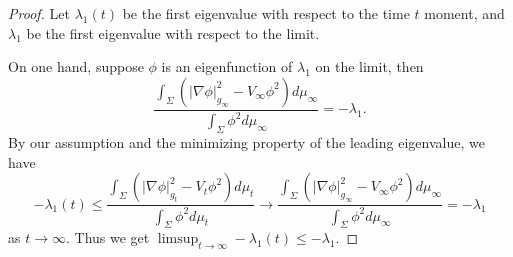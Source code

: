 \documentclass[12pt]{amsart}
\numberwithin{equation}{section}
\numberwithin{equation}{section}
\begin{document}
	\begin{proof}
		Let $\lambda_1(t)$ be the first eigenvalue with respect to the time $t$ moment, and $\lambda_1$ be the first eigenvalue with respect to the limit.
		
		On one hand, suppose $\phi$ is an eigenfunction of $\lambda_1$ on the limit, then
		$$
		\frac{ \int_\Sigma (|\nabla \phi|_{g_\infty}^2-V_\infty \phi^2 )d\mu_\infty }{\int_\Sigma \phi^2 d\mu_\infty}=-\lambda_1.
		$$
		By our assumption and the minimizing property of the leading eigenvalue, we have
		\begin{equation}
			-\lambda_1(t)\leq \frac{\int_\Sigma (|\nabla \phi|_{g_t}^2-V_t\phi^2 )d\mu_t }{\int_\Sigma \phi^2 d\mu_t} 
			\to 
			\frac{\int_\Sigma (|\nabla \phi|_{g_\infty}^2-V_\infty\phi^2) d\mu_\infty }{\int_\Sigma \phi^2 d\mu_\infty}=-\lambda_1
		\end{equation}
		as $t\to\infty$. Thus we get $\limsup_{t\to\infty} -\lambda_1(t)\leq -\lambda_1.$
		

\end{proof}
\end{document}
